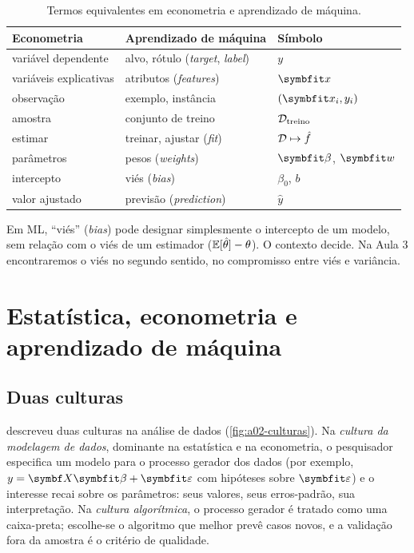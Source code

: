 \begin{table}[ht]
  \centering\small
  \caption{Termos equivalentes em econometria e aprendizado de máquina.}
  \label{tab:a02-dicionario}
  \begin{tabular}{@{}lll@{}}
    \toprule
    Econometria & Aprendizado de máquina & Símbolo \\
    \midrule
    variável dependente      & alvo, rótulo (\emph{target}, \emph{label}) & $y$ \\
    variáveis explicativas   & atributos (\emph{features})                  & $\vx$ \\
    observação               & exemplo, instância                           & $(\vx_i,y_i)$ \\
    amostra                  & conjunto de treino                           & $\mathcal{D}_{\text{treino}}$ \\
    estimar                  & treinar, ajustar (\emph{fit})                & $\mathcal{D}\mapsto\hat{f}$ \\
    parâmetros               & pesos (\emph{weights})                       & $\vbeta$, $\vw$ \\
    intercepto               & viés (\emph{bias})                           & $\beta_0$, $b$ \\
    valor ajustado           & previsão (\emph{prediction})                 & $\hat y$ \\
    \bottomrule
  \end{tabular}
\end{table}

\begin{atencao}
Em ML, ``viés'' (\emph{bias}) pode designar simplesmente o intercepto de um
modelo, sem relação com o viés de um estimador ($\mathbb{E}[\hat\theta]-\theta$). O
contexto decide. Na Aula 3 encontraremos o viés no segundo sentido, no
compromisso entre viés e variância.
\end{atencao}

\section{Estatística, econometria e aprendizado de máquina}

\subsection{Duas culturas}

\textcite{breiman2001cultures} descreveu duas culturas na análise de dados
(\cref{fig:a02-culturas}). Na \emph{cultura da modelagem de dados}, dominante
na estatística e na econometria, o pesquisador especifica um modelo para o
processo gerador dos dados (por exemplo, $y=\mX\vbeta+\ve$ com hipóteses sobre
$\ve$) e o interesse recai sobre os parâmetros: seus valores, seus erros-padrão,
sua interpretação. Na \emph{cultura algorítmica}, o processo gerador é tratado
como uma caixa-preta; escolhe-se o algoritmo que melhor prevê casos novos, e a
validação fora da amostra é o critério de qualidade.

